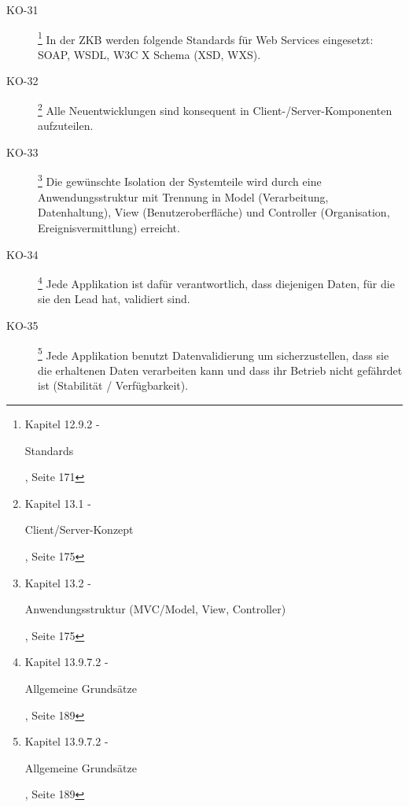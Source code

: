 \documentclass[
11pt, %
a4paper, %
BCOR25mm, %
DIV14, %
footsepline = false, %
headsepline, %
twoside, %
openright,
abstracton, %
listof=totocnumbered, %
bibliography=totocnumbered %
]{scrreprt}
\begin{document}
\begin{description}
    \item[KO-31\label{itm:KO-31}]
    \footnote{\cite{ZkbHandbuchDerItArchitektur} Kapitel 12.9.2 -
    \begin{itshape}Standards\end{itshape}, Seite 171}
    In der ZKB werden folgende Standards für Web Services eingesetzt: SOAP,
    WSDL, W3C X Schema (XSD, WXS).
    
    \item[KO-32\label{itm:KO-32}]
    \footnote{\cite{ZkbHandbuchDerItArchitektur} Kapitel 13.1 -
    \begin{itshape}Client/Server-Konzept\end{itshape}, Seite 175}
    Alle Neuentwicklungen sind konsequent in Client-/Server-Komponenten
    aufzuteilen.
    
    \item[KO-33\label{itm:KO-33}]
    \footnote{\cite{ZkbHandbuchDerItArchitektur} Kapitel 13.2 -
    \begin{itshape}Anwendungsstruktur (MVC/Model, View,
    Controller)\end{itshape}, Seite 175}
    Die gewünschte Isolation der Systemteile wird durch eine Anwendungsstruktur
    mit Trennung in Model (Verarbeitung, Datenhaltung), View
    (Benutzeroberfläche) und Controller (Organisation, Ereignisvermittlung)
    erreicht.
    
    \item[KO-34\label{itm:KO-34}]
    \footnote{\cite{ZkbHandbuchDerItArchitektur} Kapitel 13.9.7.2 -
    \begin{itshape}Allgemeine Grundsätze\end{itshape}, Seite 189}
    Jede Applikation ist dafür verantwortlich, dass diejenigen Daten, für die
    sie den Lead hat, validiert sind.
    
    \item[KO-35\label{itm:KO-35}]
    \footnote{\cite{ZkbHandbuchDerItArchitektur} Kapitel 13.9.7.2 -
    \begin{itshape}Allgemeine Grundsätze\end{itshape}, Seite 189}
    Jede Applikation benutzt Datenvalidierung um sicherzustellen, dass sie die
    erhaltenen Daten verarbeiten kann und dass ihr Betrieb nicht gefährdet ist
    (Stabilität / Verfügbarkeit).
    

\end{description}
\end{document}
